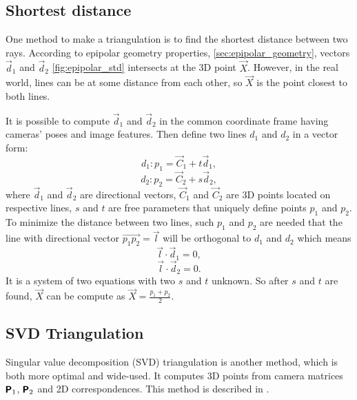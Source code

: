 \subsection{Shortest distance}
One method to make a triangulation is to find the shortest distance between two rays.
According to epipolar geometry properties, \autoref{sec:epipolar_geometry}, vectors $\vec{d}_1$ and $\vec{d}_2$ \autoref{fig:epipolar_std} intersects at the 3D point $\vec{X}$.
However, in the real world, lines can be at some distance from each other, so $\vec{X}$ is the point closest to both lines.

It is possible to compute $\vec{d}_1$ and $\vec{d}_2$ in the common coordinate frame having cameras' poses and image features.
Then define two lines $d_1$ and $d_2$ in a vector form:
\begin{equation}
    d_1: p_1 = \vec{C}_1 + t \vec{d}_1,
\end{equation}
\begin{equation}
    d_2: p_2 = \vec{C}_2 + s \vec{d}_2,
\end{equation}
where $\vec{d}_1$ and $\vec{d}_2$ are directional vectors, $\vec{C}_1$ and $\vec{C}_2$ are 3D points located on respective lines, $s$ and $t$ are free parameters that uniquely define points $p_1$ and $p_2$. 
To minimize the distance between two lines, such $p_1$ and $p_2$ are needed that the line with directional vector $\vec{p_1p_2} = \vec{l}$ will be orthogonal to $d_1$ and $d_2$ which means
\begin{equation}
    \label{eq:ldd1}
    \vec{l} \cdot \vec{d}_1 = 0,
\end{equation}
\begin{equation}
    \label{eq:ldd2}
    \vec{l} \cdot \vec{d}_2 = 0.
\end{equation}
It is a system of two equations with two $s$ and $t$ unknown.
So after $s$ and $t$ are found, $\vec{X}$ can be compute as $\vec{X} = \frac{p_1 + p_2}{2}$.

\subsection{SVD Triangulation}
Singular value decomposition (SVD) triangulation is another method, which is both more optimal and wide-used.
It computes 3D points from camera matrices $\pmb{\mathsf{P}}_1$, $\pmb{\mathsf{P}}_2$ and 2D correspondences. 
This method is described in \cite{hartley_zisserman_2004}.

